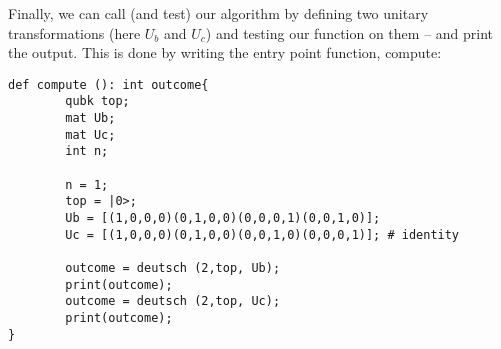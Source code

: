 Finally, we can call (and test) our algorithm by defining two unitary transformations (here $U_b$ and $U_c$) and testing our function on them -- and print the output. This is done by writing the entry point function, \textsf{compute}:
\begin{lstlisting}
def compute (): int outcome{
        qubk top;
        mat Ub;
        mat Uc;
        int n;
        
        n = 1;
        top = |0>;
        Ub = [(1,0,0,0)(0,1,0,0)(0,0,0,1)(0,0,1,0)];
        Uc = [(1,0,0,0)(0,1,0,0)(0,0,1,0)(0,0,0,1)]; # identity

        outcome = deutsch (2,top, Ub);
        print(outcome);
        outcome = deutsch (2,top, Uc);
        print(outcome);
}
\end{lstlisting}


